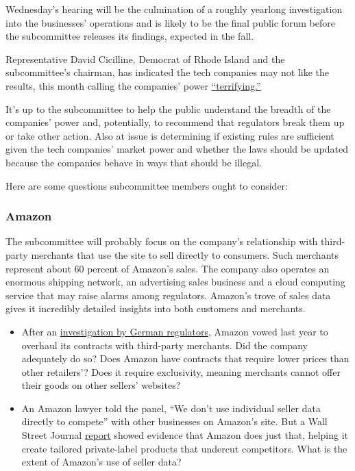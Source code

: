 Wednesday's hearing will be the culmination of a roughly yearlong
investigation into the businesses' operations and is likely to be the
final public forum before the subcommittee releases its findings,
expected in the fall.

Representative David Cicilline, Democrat of Rhode Island and the
subcommittee's chairman, has indicated the tech companies may not like
the results, this month calling the companies' power
\href{https://www.nytimes.com/2020/07/01/opinion/anti-trust-tech-hearing-facebook.html}{``terrifying.''}

It's up to the subcommittee to help the public understand the breadth of
the companies' power and, potentially, to recommend that regulators
break them up or take other action. Also at issue is determining if
existing rules are sufficient given the tech companies' market power and
whether the laws should be updated because the companies behave in ways
that should be illegal.

Here are some questions subcommittee members ought to consider:

\hypertarget{amazon}{%
\subsubsection{Amazon}\label{amazon}}

The subcommittee will probably focus on the company's relationship with
third-party merchants that use the site to sell directly to consumers.
Such merchants represent about 60 percent of Amazon's sales. The company
also operates an enormous shipping network, an advertising sales
business and a cloud computing service that may raise alarms among
regulators. Amazon's trove of sales data gives it incredibly detailed
insights into both customers and merchants.

\begin{itemize}
\tightlist
\item
  After an
  \href{https://www.cnbc.com/2019/07/17/amazon-in-deal-with-german-watchdog-to-overhaul-marketplace-terms.html}{investigation
  by German regulators}, Amazon vowed last year to overhaul its
  contracts with third-party merchants. Did the company adequately do
  so? Does Amazon have contracts that require lower prices than other
  retailers'? Does it require exclusivity, meaning merchants cannot
  offer their goods on other sellers' websites?
\end{itemize}

\begin{itemize}
\tightlist
\item
  An Amazon lawyer told the panel, ``We don't use individual seller data
  directly to compete'' with other businesses on Amazon's site. But a
  Wall Street Journal
  \href{https://www.wsj.com/articles/amazon-scooped-up-data-from-its-own-sellers-to-launch-competing-products-11587650015}{report}
  showed evidence that Amazon does just that, helping it create tailored
  private-label products that undercut competitors. What is the extent
  of Amazon's use of seller data?
\end{itemize}

